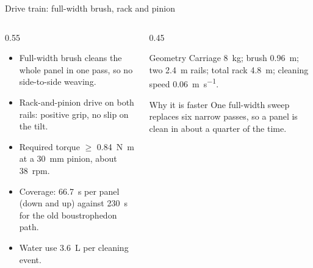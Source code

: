 \documentclass[aspectratio=169,10pt]{beamer}
\begin{document}
\begin{frame}{Drive train: full-width brush, rack and pinion}
  \begin{columns}[T]
    \begin{column}{0.55\textwidth}
      \begin{itemize}\setlength\itemsep{0.35em}
        \item Full-width brush cleans the whole panel in one pass, so no side-to-side weaving.
        \item Rack-and-pinion drive on both rails: positive grip, no slip on the tilt.
        \item Required torque $\geq$ \SI{0.84}{\newton\meter} at a \SI{30}{mm} pinion, about \SI{38}{rpm}.
        \item Coverage: \SI{66.7}{s} per panel (down and up) against \SI{230}{s} for the old boustrophedon path.
        \item Water use \SI{3.6}{\liter} per cleaning event.
      \end{itemize}
    \end{column}
    \begin{column}{0.45\textwidth}
      \begin{block}{Geometry}
        Carriage \SI{8}{kg}; brush \SI{0.96}{m}; two \SI{2.4}{m} rails; total rack \SI{4.8}{m}; cleaning speed \SI{0.06}{\meter\per\second}.
      \end{block}
      \begin{block}{Why it is faster}
        One full-width sweep replaces six narrow passes, so a panel is clean in about a quarter of the time.
      \end{block}
    \end{column}
  \end{columns}
\end{frame}
\end{document}

